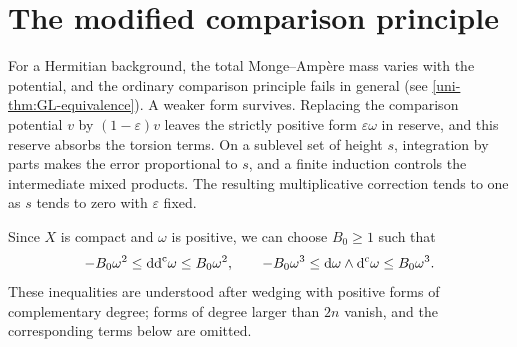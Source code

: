 \section{The modified comparison principle}

For a Hermitian background, the total Monge--Amp\`ere mass varies with the potential, and the ordinary comparison principle fails in general (see \cref{uni-thm:GL-equivalence}). A weaker form survives. Replacing the comparison potential $v$ by $(1-\varepsilon)v$ leaves the strictly positive form $\varepsilon\omega$ in reserve, and this reserve absorbs the torsion terms. On a sublevel set of height $s$, integration by parts makes the error proportional to $s$, and a finite induction controls the intermediate mixed products. The resulting multiplicative correction tends to one as $s$ tends to zero with $\varepsilon$ fixed.

Since $X$ is compact and $\omega$ is positive, we can choose $B_0\geq1$ such that
\[
 -B_0\omega^2\leq\mathrm{dd}^{\mathrm{c}}\omega\leq B_0\omega^2,
 \qquad
 -B_0\omega^3\leq \mathrm{d}\omega\wedge\mathrm d^{\mathrm c}\omega\leq B_0\omega^3.
\]
These inequalities are understood after wedging with positive forms of complementary degree; forms of degree larger than $2n$ vanish, and the corresponding terms below are omitted.

